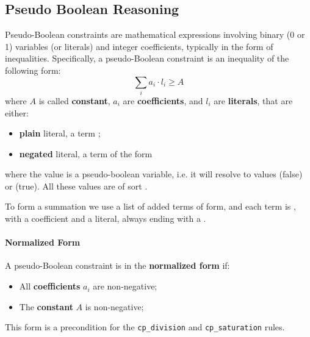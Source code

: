 \subsection{Pseudo Boolean Reasoning}

Pseudo-Boolean constraints are mathematical expressions involving binary (0 or 1) variables
(or literals) and integer coefficients, typically in the form of inequalities.
Specifically, a pseudo-Boolean constraint is an inequality of the following form:
\[
    \sum_i a_i \cdot l_i \geq A
\]
where $A$ is called \textbf{constant}, $a_i$ are \textbf{coefficients},
and $l_i$ are \textbf{literals}, that are either:
\begin{itemize}
    \item \textbf{plain} literal, a term ;
    \item \textbf{negated} literal, a term of the form 
\end{itemize}

where the  value is a pseudo-boolean variable,
i.e. it will resolve to values  (false) or  (true).
All these values are of sort .

To form a summation we use a list of added terms of form,
 and each term is
, with a coefficient and a literal, always ending with a .


\paragraph{Normalized Form}
A pseudo-Boolean constraint is in the \textbf{normalized form} if:
\begin{itemize}
    \item All \textbf{coefficients} $a_i$ are non-negative;
    \item The \textbf{constant} $A$ is non-negative;
\end{itemize}

This form is a precondition for the \texttt{cp\_division} and \texttt{cp\_saturation} rules.


